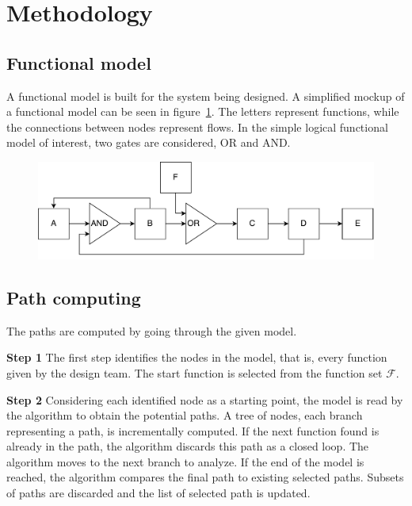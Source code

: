 \section{Methodology}

\subsection{Functional model}

A functional model is built for the system being designed. A simplified mockup of a functional model can be seen in figure~\ref{fig:fm_mockup}. The letters represent functions, while the connections between nodes represent flows. In the simple logical functional model of interest, two gates are considered, OR and AND.

\begin{figure}[!htb]
	\centering
	\includegraphics[height=0.2\textheight]{fig/mockup}
	\label{fig:fm_mockup}
\end{figure}

\subsection{Path computing}

The paths are computed by going through the given model.

\textbf{Step 1}\hspace{5pt}
The first step identifies the nodes in the model, that is, every function given by the design team. The start function is selected from the function set $\mathscr{F}$. 

\textbf{Step 2}\hspace{5pt}
Considering each identified node as a starting point, the model is read by the algorithm to obtain the potential paths. A tree of nodes, each branch representing a path, is incrementally computed. If the next function found is already in the path, the algorithm discards this path as a closed loop. The algorithm moves to the next branch to analyze. If the end of the model is reached, the algorithm compares the final path to existing selected paths. Subsets of paths are discarded and the list of selected path is updated.

